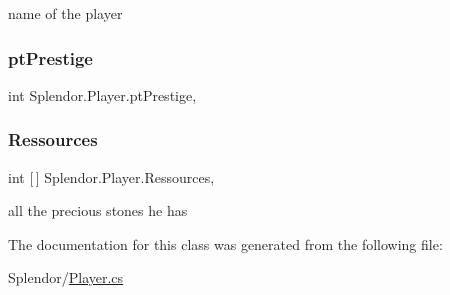 name of the player 

\mbox{\label{class_splendor_1_1_player_ab158cd0ee0def52608afd93eb97ba094}} 
\subsubsection{\texorpdfstring{pt\+Prestige}{ptPrestige}}
{\footnotesize\ttfamily int Splendor.\+Player.\+pt\+Prestige\hspace{0.3cm}{\ttfamily [get]}, {\ttfamily [set]}}

\mbox{\label{class_splendor_1_1_player_a1c5ccd2470e3bbc84e9a156bc323bfd0}} 
\subsubsection{\texorpdfstring{Ressources}{Ressources}}
{\footnotesize\ttfamily int \mbox{[}$\,$\mbox{]} Splendor.\+Player.\+Ressources\hspace{0.3cm}{\ttfamily [get]}, {\ttfamily [set]}}



all the precious stones he has 



The documentation for this class was generated from the following file\+:\begin{DoxyCompactItemize}
\item 
Splendor/\hyperlink{_player_8cs}{Player.\+cs}\end{DoxyCompactItemize}
